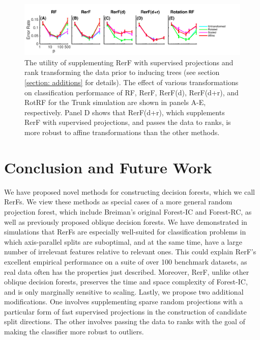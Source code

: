 \documentclass[10pt]{article}
\begin{document}
\begin{figure}[ht]
\vskip 0.2in
\begin{center}
\centerline{\includegraphics[width=\columnwidth]{../../Figures/pdf/Fig5_robustness2}}
\caption{The utility of supplementing RerF with supervised projections and rank transforming the data prior to inducing trees (see section \ref{section: additions} for details). The effect of various transformations on classification performance of RF, RerF, RerF(d), RerF(d+r), and RotRF for the Trunk simulation are shown in panels A-E, respectively. Panel D shows that RerF(d+r), which supplements RerF with supervised projections, and passes the data to ranks, is more robust to affine transformations than the other methods.}
\label{robustness}
\end{center}
\vskip -0.2in
\end{figure}


\section{Conclusion and Future Work}

We have proposed novel methods for constructing decision forests, which we call RerFs. We view these methods as special cases of a more general random projection forest, which include Breiman's original Forest-IC and Forest-RC, as well as previously proposed oblique decision forests. We have demonstrated in simulations that RerFs are especially well-suited for classification problems in which axis-parallel splits are suboptimal, and at the same time, have a large number of irrelevant features relative to relevant ones. This could explain RerF's excellent empirical performance on a suite of over 100 benchmark datasets, as real data often has the properties just described. Moreover, RerF, unlike other oblique decision forests, preserves the time and space complexity of Forest-IC, and is only marginally sensitive to scaling. Lastly, we propose two additional modifications. One involves supplementing sparse random projections with a particular form of fast supervised projections in the construction of candidate split directions. The other involves passing the data to ranks with the goal of making the classifier more robust to outliers.
\end{document}
